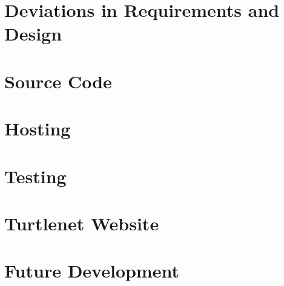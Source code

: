 \chapter{Deviations in Requirements and Design}


\chapter{Source Code}


\chapter{Hosting}


\chapter{Testing}


\chapter{Turtlenet Website}


\chapter{Future Development}

